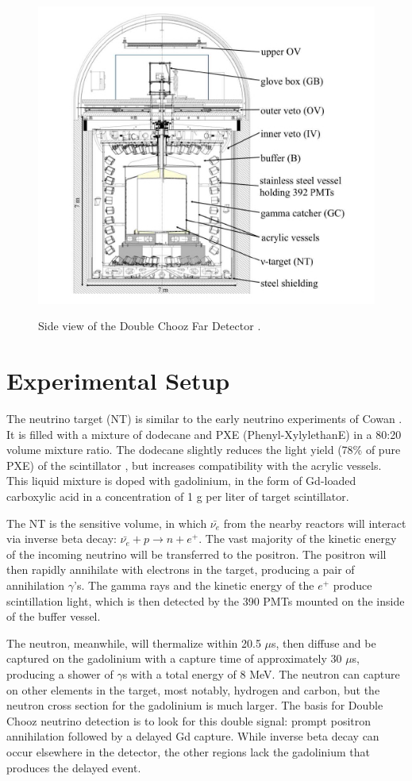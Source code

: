 \begin{figure}
\caption{Side view of the Double Chooz Far Detector \cite{DC_2012}.}
\centering
\includegraphics[width=.5 \textwidth]{DC_Results/Double_Chooz_Xsection.jpg}
\label{X_Section}
\end{figure}

\section{Experimental Setup}
The neutrino target (NT) is similar to the early neutrino experiments of Cowan \cite{Cowan}. It is filled with a mixture of dodecane and PXE (Phenyl-XylylethanE) in a 80:20 volume mixture ratio. The dodecane slightly reduces the light yield (78\% of pure PXE) of the scintillator \cite{DCWhitepaper}, but increases compatibility with the acrylic vessels.  This liquid mixture is doped with gadolinium, in the form of Gd-loaded carboxylic acid in a concentration of 1 g per liter of target scintillator.

The NT is the sensitive volume, in which $\bar{\nu_e}$ from the nearby reactors will interact via inverse beta decay: $\bar{\nu_e} + p \rightarrow n + e^{+}$. The vast majority of the kinetic energy of the incoming neutrino will be transferred to the positron. The positron will then rapidly annihilate with electrons in the target, producing a pair of annihilation $\gamma$'s. The gamma rays and the kinetic energy of the $e^{+}$ produce scintillation light, which is then detected by the 390 PMTs mounted on the inside of the buffer vessel. 

The neutron, meanwhile, will thermalize within 20.5 $\mu$s, then diffuse and be captured on the gadolinium with a capture time of approximately 30 $\mu$s, producing a shower of $\gamma$s with a total energy of 8 MeV. The neutron can capture on other elements in the target, most notably, hydrogen and carbon, but the neutron cross section for the gadolinium is much larger.  The basis for Double Chooz neutrino detection is to look for this double signal: prompt positron annihilation followed by a delayed Gd capture. While inverse beta decay can occur elsewhere in the detector, the other regions lack the gadolinium that produces the delayed event. 

